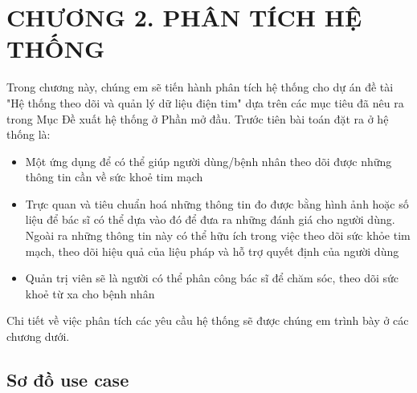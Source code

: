 
\section*{CHƯƠNG 2. PHÂN TÍCH HỆ THỐNG}
\setcounter{section}{2}
\setcounter{subsection}{0} %
\setcounter{table}{0} %
\setcounter{figure}{0} %
Trong chương này, chúng em sẽ tiến hành phân tích hệ thống cho dự án đề tài "Hệ thống theo dõi và quản lý dữ liệu điện tim" dựa trên các mục tiêu
đã nêu ra trong Mục Đề xuất hệ thống ở Phần mở đầu. Trước tiên bài toán đặt ra ở hệ thống là:
\begin{adjustwidth}{1.5em}{}
\begin{itemize}
  \item Một ứng dụng để có thể giúp người dùng/bệnh nhân theo dõi được những thông tin cần về sức khoẻ tim mạch
  \item Trực quan và tiêu chuẩn hoá những thông tin đo được
    bằng hình ảnh hoặc số liệu để bác sĩ có thể dựa vào đó để đưa ra những đánh giá cho người dùng. Ngoài ra những thông tin này
    có thể hữu ích trong việc theo dõi sức khỏe tim mạch, theo dõi hiệu quả của liệu pháp 
    và hỗ trợ quyết định của người dùng
  \item Quản trị viên sẽ là người có thể phân công bác sĩ để chăm sóc, theo dõi sức khoẻ từ
  xa cho bệnh nhân
\end{itemize}
\end{adjustwidth}
Chi tiết về việc phân tích các yêu cầu hệ thống sẽ được chúng em trình bày ở các chương dưới.

\subsection{Sơ đồ use case}
